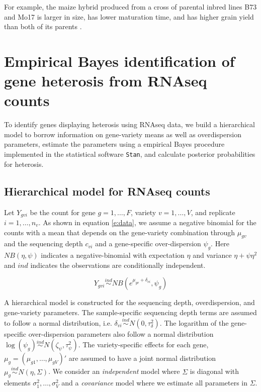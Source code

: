 \documentclass[useAMS,usenatbib,referee]{biom}
\begin{document}
For example, the maize hybrid produced from a cross of parental inbred lines B73 and Mo17 is larger in size, has lower maturation time, and has higher grain yield than both of its parents \cite{hallauer2010quantitative}.

\section{Empirical Bayes identification of gene heterosis from RNAseq counts}

To identify genes displaying heterosis using RNAseq data, we build a hierarchical model to borrow information on gene-variety means as well as overdispersion parameters, estimate the parameters using a empirical Bayes procedure implemented in the statistical software {\tt Stan}, and calculate posterior probabilities for heterosis. 

\subsection{Hierarchical model for RNAseq counts}
\label{s:model}

Let $Y_{gvi}$ be the count for gene $g=1,\ldots,F$, variety $v=1,\ldots,V$, and replicate $i=1,\ldots,n_v$. As shown in equation \eqref{e:data}, we assume a negative binomial for the counts with a mean that depends on the gene-variety combination through $\mu_{gv}$ and the sequencing depth $c_{vi}$ and a gene-specific over-dispersion $\psi_g$. Here $NB(\eta,\psi)$ indicates a negative-binomial with expectation $\eta$ and variance $\eta+\psi\eta^2$ and $ind$ indicates the observations are conditionally independent.

\begin{equation} 
Y_{gvi} \stackrel{ind}{\sim} NB(e^{\mu_{gv}+\delta_{vi}},\psi_g) 
\label{e:data}
\end{equation}

A hierarchical model is constructed for the sequencing depth, overdispersion, and gene-variety parameters. The sample-specific sequencing depth terms are assumed to follow a normal distribution, i.e. $\delta_{vi} \stackrel{ind}{\sim} N(0,\tau_\delta^2)$. The logarithm of the gene-specific over-dispersion parameters also follow a normal distribution $\log(\psi_g) \stackrel{ind}{\sim} N(\zeta_\psi,\tau_\psi^2)$. The variety-specific effects for each gene, $\mu_g = (\mu_{g1},\ldots,\mu_{gV})'$ are assumed to have a joint normal distribution $\mu_g \stackrel{ind}{\sim} N(\eta, \Sigma)$. We consider an \emph{independent} model where $\Sigma$ is diagonal with elements $\sigma_1^2,\ldots,\sigma_V^2$ and a \emph{covariance} model where we estimate all parameters in $\Sigma$. 
\end{document}
